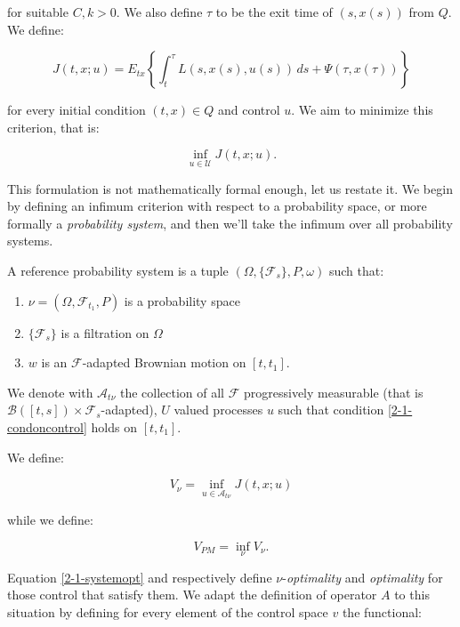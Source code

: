 for suitable $C,k>0$. We also define $\tau$ to be the exit time of $(s,x(s))$ from $Q$. We define:

\begin{equation}
    J(t,x;u) = E_{tx}\left\{\int_t^{\tau} L(s,x(s),u(s))\,ds + \Psi(\tau,x(\tau))\right\}
\end{equation}

for every initial condition $(t,x)\in Q$ and control $u$. We aim to minimize this criterion, that is:

\[\inf_{u\in\mathcal{U}}J(t,x;u).\]

This formulation is not mathematically formal enough, let us restate it. We begin by defining an infimum criterion with respect to a probability space, or more 
formally a \textit{probability system}, and then we'll take the infimum over all probability systems. 

\begin{definition}
    A reference probability system is a tuple $(\Omega,\{\mathcal{F}_s\},P,\omega)$ such that:
    
    \begin{enumerate}[label=\alph*)]
        \item $\nu=(\Omega,\mathcal{F}_{t_1},P)$ is a probability space
        \item $\{\mathcal{F}_s\}$ is a filtration on $\Omega$
        \item $w$ is an $\mathcal{F}$-adapted Brownian motion on $[t,t_1]$.
    \end{enumerate}

    We denote with $\mathcal{A}_{t\nu}$ the collection of all $\mathcal{F}$ progressively measurable (that is $\mathcal{B}([t,s])\times\mathcal{F}_s$-adapted), 
    $U$ valued processes $u$ such that condition \ref{2-1-condoncontrol} holds on $[t,t_1]$.
\end{definition}

We define:

\begin{equation}\label{2-1-systemopt}
    V_{\nu} = \inf_{u\in\mathcal{A}_{t\nu}} J(t,x;u)
\end{equation}

while we define:

\begin{equation}\label{2-1-opt}
    V_{PM} = \inf_{\nu} V_{\nu}.
\end{equation}

Equation \ref{2-1-systemopt} and \label{2-1-opt} respectively define $\nu$-\textit{optimality} and \textit{optimality} for those control that 
satisfy them. We adapt the definition of operator $A$ to this situation by defining for every element of the control space $v$ the functional:

